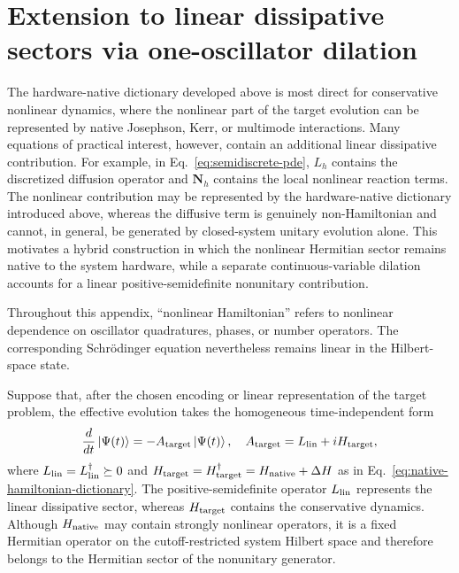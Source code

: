 \documentclass[pra,twocolumn,superscriptaddress,nofootinbib,floatfix]{revtex4-2}
\theoremstyle{remark}
\begin{document}
\section{Extension to linear dissipative sectors via one-oscillator dilation}
\label{app:lchs}

The hardware-native dictionary developed above is most direct for conservative nonlinear dynamics, where the nonlinear part of the target evolution can be represented by native Josephson, Kerr, or multimode interactions. Many equations of practical interest, however, contain an additional linear dissipative contribution. For example, in Eq.~\eqref{eq:semidiscrete-pde}, \(L_h\) contains the discretized diffusion operator and \(\mathbf N_h\) contains the local nonlinear reaction terms. The nonlinear contribution may be represented by the hardware-native dictionary introduced above, whereas the diffusive term is genuinely non-Hamiltonian and cannot, in general, be generated by closed-system unitary evolution alone. This motivates a hybrid construction in which the nonlinear Hermitian sector remains native to the system hardware, while a separate continuous-variable dilation accounts for a linear positive-semidefinite nonunitary contribution.

Throughout this appendix, ``nonlinear Hamiltonian'' refers to nonlinear dependence on oscillator quadratures, phases, or number operators. The corresponding Schr\"odinger equation nevertheless remains linear in the Hilbert-space state.

Suppose that, after the chosen encoding or linear representation of the target problem, the effective evolution takes the homogeneous time-independent form
\begin{align}
\frac{d}{dt}\ket{\Psi(t)}=-A_{\rm target}\ket{\Psi(t)},\quad A_{\rm target}=L_{\rm lin}+iH_{\rm target},
\label{eq:general-nonunitary-evolution}
\end{align}
where \(L_{\rm lin}=L_{\rm lin}^{\dagger}\succeq0\) and \(H_{\rm target}=H_{\rm target}^{\dagger}=H_{\rm native}+\Delta H\) as in Eq.~\eqref{eq:native-hamiltonian-dictionary}. The positive-semidefinite operator \(L_{\rm lin}\) represents the linear dissipative sector, whereas \(H_{\rm target}\) contains the conservative dynamics. Although \(H_{\rm native}\) may contain strongly nonlinear operators, it is a fixed Hermitian operator on the cutoff-restricted system Hilbert space and therefore belongs to the Hermitian sector of the nonunitary generator.
\end{document}
